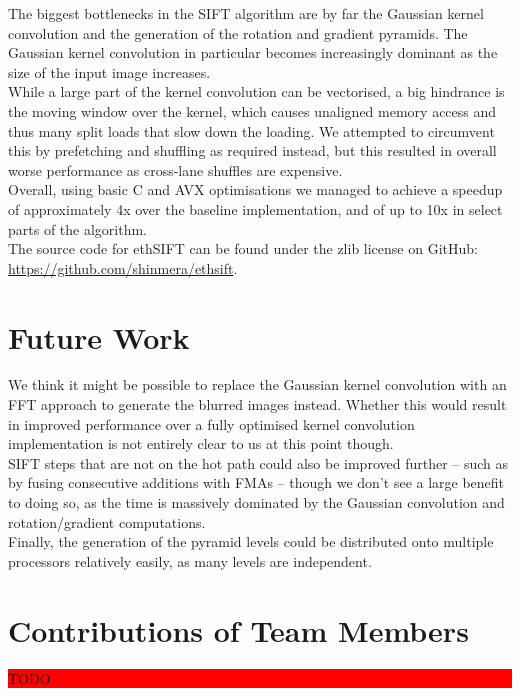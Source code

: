 \documentclass[letterpaper]{article}
\begin{document}
The biggest bottlenecks in the SIFT algorithm are by far the Gaussian kernel convolution and the generation of the rotation and gradient pyramids. The Gaussian kernel convolution in particular becomes increasingly dominant as the size of the input image increases. \\

While a large part of the kernel convolution can be vectorised, a big hindrance is the moving window over the kernel, which causes unaligned memory access and thus many split loads that slow down the loading. We attempted to circumvent this by prefetching and shuffling as required instead, but this resulted in overall worse performance as cross-lane shuffles are expensive. \\

Overall, using basic C and AVX optimisations we managed to achieve a speedup of approximately 4x over the baseline implementation, and of up to 10x in select parts of the algorithm. \\

The source code for ethSIFT can be found under the zlib license on GitHub: \\\url{https://github.com/shinmera/ethsift}.

\section{Future Work}
We think it might be possible to replace the Gaussian kernel convolution with an FFT approach to generate the blurred images instead. Whether this would result in improved performance over a fully optimised kernel convolution implementation is not entirely clear to us at this point though. \\

SIFT steps that are not on the hot path could also be improved further -- such as by fusing consecutive additions with FMAs -- though we don't see a large benefit to doing so, as the time is massively dominated by the Gaussian convolution and rotation/gradient computations. \\

Finally, the generation of the pyramid levels could be distributed onto multiple processors relatively easily, as many levels are independent. \\

\section{Contributions of Team Members}
\colorbox{red}{\parbox{0.45\textwidth}{TODO}} \\
\end{document}
